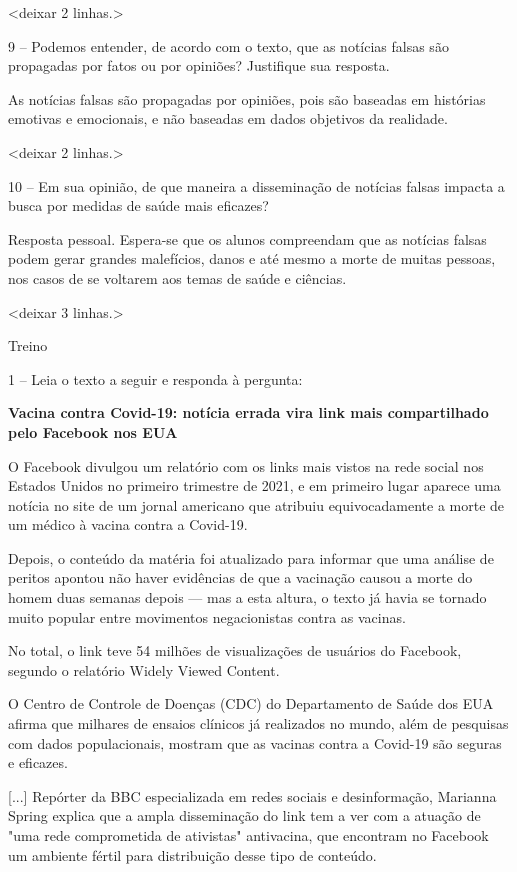 \textless{}deixar 2 linhas.\textgreater{}

9 -- Podemos entender, de acordo com o texto, que as notícias falsas são
propagadas por fatos ou por opiniões? Justifique sua resposta.

As notícias falsas são propagadas por opiniões, pois são baseadas em
histórias emotivas e emocionais, e não baseadas em dados objetivos da
realidade.

\textless{}deixar 2 linhas.\textgreater{}

10 -- Em sua opinião, de que maneira a disseminação de notícias falsas
impacta a busca por medidas de saúde mais eficazes?

Resposta pessoal. Espera-se que os alunos compreendam que as notícias
falsas podem gerar grandes malefícios, danos e até mesmo a morte de
muitas pessoas, nos casos de se voltarem aos temas de saúde e ciências.

\textless{}deixar 3 linhas.\textgreater{}

Treino

1 -- Leia o texto a seguir e responda à pergunta:

\textbf{Vacina contra Covid-19: notícia errada vira link mais
compartilhado pelo Facebook nos EUA}

O Facebook divulgou um relatório com os links mais vistos na rede social
nos Estados Unidos no primeiro trimestre de 2021, e em primeiro lugar
aparece uma notícia no site de um jornal americano que atribuiu
equivocadamente a morte de um médico à vacina contra a Covid-19.

Depois, o conteúdo da matéria foi atualizado para informar que uma
análise de peritos apontou não haver evidências de que a vacinação
causou a morte do homem duas semanas depois --- mas a esta altura, o
texto já havia se tornado muito popular entre movimentos negacionistas
contra as vacinas.

No total, o link teve 54 milhões de visualizações de usuários do
Facebook, segundo o relatório Widely Viewed Content.

O Centro de Controle de Doenças (CDC) do Departamento de Saúde dos EUA
afirma que milhares de ensaios clínicos já realizados no mundo, além de
pesquisas com dados populacionais, mostram que as vacinas contra a
Covid-19 são seguras e eficazes.

{[}...{]} Repórter da BBC especializada em redes sociais e
desinformação, Marianna Spring explica que a ampla disseminação do link
tem a ver com a atuação de "uma rede comprometida de ativistas"
antivacina, que encontram no Facebook um ambiente fértil para
distribuição desse tipo de conteúdo.

